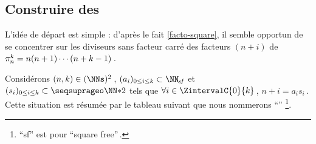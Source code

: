 

\subsection{Construire des \sftab[x]}

\leavevmode
\smallskip

L'idée de départ est simple : d'après le fait \ref{facto-square}, il semble opportun de se concentrer sur les diviseurs sans facteur carré des facteurs $(n + i)$ de $\consprod = n (n + 1) \cdots (n + k - 1)$\,.




\begin{defi}
	Considérons $(n, k) \in ( \NNs )^2$\,,
	$( a_i )_{0 \leq i \leq k} \subset \NNsf$
	et
	$( s_i )_{0 \leq i \leq k} \subset \NNssquare$
	tels que
	$\forall i \in \ZintervalC{0}{k}$\,, $n + i = a_i s_i$\,.
	Cette situation est résumée par le tableau suivant que nous nommerons \enquote{\sftab}
	\footnote{
		\enquote{sf} est pour \enquote{square free}\,.
	}.

	\begin{center}
	\end{center}
\end{defi}




